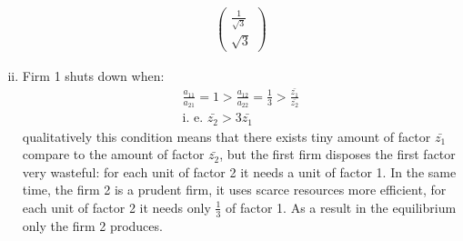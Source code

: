 \documentclass[a4paper]{article}
\begin{document}
\begin{enumerate}[(i)]
\begin{align*}
\begin{pmatrix}
\frac{1}{\sqrt{3}}\\
\sqrt{3}
\end{pmatrix}
\end{align*}
\item Firm 1 shuts down when:
\begin{align*}
\frac{a_{11}}{a_{21}} = 1 > \frac{a_{12}}{a_{22}} = \frac{1}{3} > \frac{\bar{z_1}}{\bar{z_2}}\\
\text{i. e. } \bar{z_2} > 3 \bar{z_1}
\end{align*}
qualitatively this condition means that there exists tiny amount of factor $\bar{z_1}$ compare to the amount of factor $\bar{z_2}$, but the first firm disposes the first factor very wasteful: for each unit of factor 2 it needs a unit of factor 1. In the same time, the firm 2 is a prudent firm, it uses scarce resources more efficient, for each unit of factor 2 it needs only $\frac{1}{3}$ of factor 1. As a result in the equilibrium only the firm 2 produces.
\end{enumerate}
\end{document}
